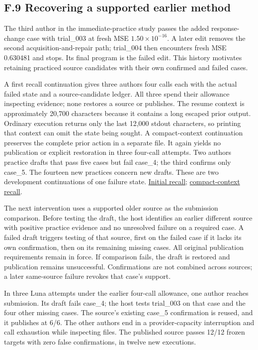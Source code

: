 \documentclass[11pt,a4paper]{article}
\begin{document}
\subsection*{F.9 Recovering a supported earlier method}

The third author in the immediate-practice study passes the added response-change
case with trial\_003 at fresh MSE \(1.50\times10^{-16}\). A later edit removes the
second acquisition-and-repair path; trial\_004 then encounters fresh MSE 0.630481
and stops. Its final program is the failed edit. This history motivates retaining
practiced source candidates with their own confirmed and failed cases.


A first recall continuation gives three authors four calls each with the actual
failed state and a source-candidate ledger. All three spend their allowance
inspecting evidence; none restores a source or publishes. The resume context is
approximately 20,700 characters because it contains a long escaped prior output.
Ordinary execution returns only the last 12,000 stdout characters, so printing
that context can omit the state being sought. A compact-context continuation
preserves the complete prior action in a separate file. It again yields no
publication or explicit restoration in three four-call attempts. Two authors
practice drafts that pass five cases but fail case\_4; the third confirms only
case\_5. The fourteen new practices concern new drafts. These are two development
continuations of one failure state.
\hyperlink{artifact-94}{Initial recall};
\hyperlink{artifact-95}{compact-context recall}.


The next intervention uses a supported older source as the submission comparison.
Before testing the draft, the host identifies an earlier different source with
positive practice evidence and no unresolved failure on a required case. A failed
draft triggers testing of that source, first on the failed case if it lacks its
own confirmation, then on its remaining missing cases. All original publication
requirements remain in force. If comparison fails, the draft is restored and
publication remains unsuccessful. Confirmations are not combined across sources;
a later same-source failure revokes that case's support.


In three Luna attempts under the earlier four-call allowance, one author reaches
submission. Its draft fails case\_4; the host tests trial\_003 on that case and the
four other missing cases. The source's existing case\_5 confirmation is reused,
and it publishes at 6/6. The other authors end in a provider-capacity interruption
and call exhaustion while inspecting files. The published source passes 12/12
frozen targets with zero false confirmations, in twelve new executions.
\end{document}
